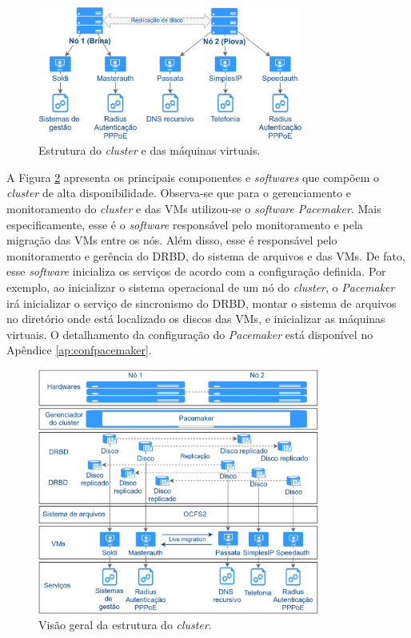 \begin{figure}[h!]
 \centering
 \includegraphics[width=330px]{img/projeto_vms.eps}
 \caption{Estrutura do \textit{cluster} e das máquinas virtuais.}
 \label{fig:projeto_vms}
\end{figure}

A Figura \ref{fig:projeto_estrutura} apresenta os principais componentes e \textit{softwares} que compõem o \textit{cluster} de alta 
disponibilidade. Observa-se que para o gerenciamento e monitoramento do \textit{cluster} e das \acp{VM} utilizou-se o \textit{software} 
\textit{Pacemaker}. Mais especificamente, esse é o \textit{software} responsável pelo monitoramento e pela migração das \acp{VM} entre os nós. 
Além disso, esse é responsável pelo monitoramento e gerência do \ac{DRBD}, do sistema de arquivos e das \acp{VM}. De fato, esse \textit{software} 
inicializa os serviços de acordo com a configuração definida. Por exemplo, ao inicializar o sistema operacional de um nó do \textit{cluster}, 
o \textit{Pacemaker} irá inicializar o serviço de sincronismo do \ac{DRBD}, montar o sistema de arquivos no diretório onde está localizado os 
discos das \acp{VM}, e inicializar as máquinas virtuais. O detalhamento da configuração do \textit{Pacemaker} está disponível no 
Apêndice \ref{ap:confpacemaker}.

\begin{figure}[h!]
 \centering
 \includegraphics[width=350px]{img/projeto_estrutura.eps}
 \caption{Visão geral da estrutura do \textit{cluster}.}
 \label{fig:projeto_estrutura}
\end{figure}

